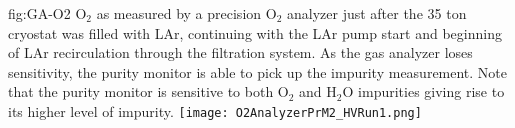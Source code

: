 \begin{dunefigure}{fig:GA-O2}
  {$\text{O}_2$ as measured by a precision $\text{O}_2$ analyzer just after the 35 ton cryostat was filled with LAr, continuing with the LAr pump start and beginning of LAr recirculation through the filtration system. As the gas analyzer loses sensitivity, the purity monitor is able to pick up the impurity measurement. Note that the purity monitor is sensitive to both $\text{O}_2$ and $\text{H}_2\text{O}$ impurities giving rise to its higher level of impurity.}
  \texttt{[image: O2AnalyzerPrM2\_HVRun1.png]}%
\end{dunefigure}
